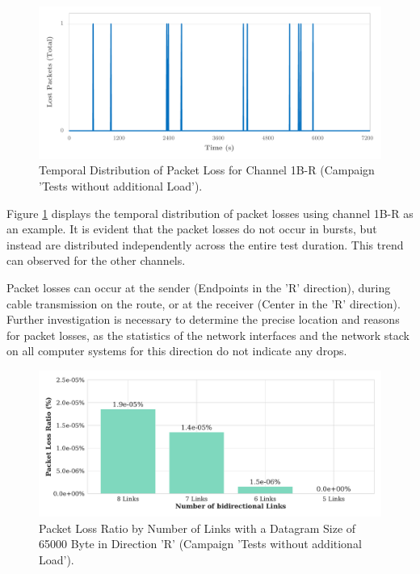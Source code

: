 \begin{figure}[h!]
    \centering
    \includegraphics[width=1\linewidth]{figures/reliability/ihawk/diagr4.pdf}
    \caption{Temporal Distribution of Packet Loss for Channel 1B-R (Campaign 'Tests without additional Load').}
    \label{fig:diagr4Temp}
\end{figure}

Figure \ref{fig:diagr4Temp} displays the temporal distribution of packet losses using channel 1B-R as an example. It is evident that the packet losses do not occur in bursts, but instead are distributed independently across the entire test duration. This trend can observed for the other channels.

Packet losses can occur at the sender (Endpoints in the 'R' direction), during cable transmission on the route, or at the receiver (Center in the 'R' direction). Further investigation is necessary to determine the precise location and reasons for packet losses, as the statistics of the network interfaces and the network stack on all computer systems for this direction do not indicate any drops.

\begin{figure}[h!]
    \centering
    \includegraphics[width=1\linewidth]{figures/reliability/ihawk/diagr5.pdf}
    \caption{Packet Loss Ratio by Number of Links with a Datagram Size of 65000 Byte in Direction 'R' (Campaign 'Tests without additional Load').}
    \label{fig:diagr5Loss}
\end{figure}

